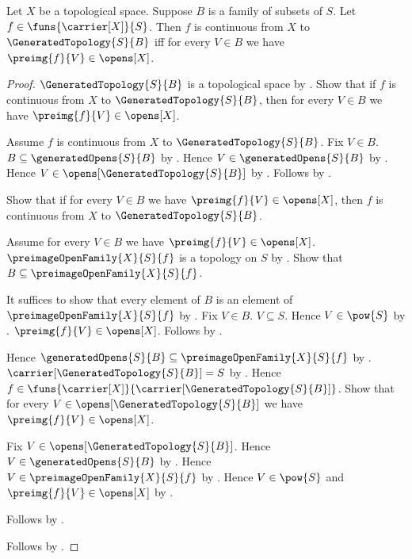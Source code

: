 \begin{theorem}\label{continuous_to_generated_topology_iff}
    Let $X$ be a topological space.
    Suppose $B$ is a family of subsets of $S$.
    Let $f\in\funs{\carrier[X]}{S}$.
    Then $f$ is continuous from $X$ to $\GeneratedTopology{S}{B}$ iff
        for every $V\in B$ we have $\preimg{f}{V}\in\opens[X]$.
\end{theorem}
\begin{proof}
    $\GeneratedTopology{S}{B}$ is a topological space by
        .
    Show that if $f$ is continuous from $X$ to
        $\GeneratedTopology{S}{B}$, then for every $V\in B$ we have
        $\preimg{f}{V}\in\opens[X]$.
    \begin{subproof}
        Assume $f$ is continuous from $X$ to $\GeneratedTopology{S}{B}$.
        Fix $V\in B$.
        $B\subseteq\generatedOpens{S}{B}$ by
            .
        Hence $V\in\generatedOpens{S}{B}$ by .
        Hence $V\in\opens[\GeneratedTopology{S}{B}]$ by
            .
        Follows by .
    \end{subproof}

    Show that if for every $V\in B$ we have
        $\preimg{f}{V}\in\opens[X]$, then
        $f$ is continuous from $X$ to $\GeneratedTopology{S}{B}$.
    \begin{subproof}
        Assume for every $V\in B$ we have
            $\preimg{f}{V}\in\opens[X]$.
        $\preimageOpenFamily{X}{S}{f}$ is a topology on $S$ by
            .
        Show that $B\subseteq\preimageOpenFamily{X}{S}{f}$.
        \begin{subproof}
            It suffices to show that every element of $B$ is an element of
                $\preimageOpenFamily{X}{S}{f}$ by .
            Fix $V\in B$.
            $V\subseteq S$.
            Hence $V\in\pow{S}$ by .
            $\preimg{f}{V}\in\opens[X]$.
            Follows by .
        \end{subproof}
        Hence $\generatedOpens{S}{B}
            \subseteq\preimageOpenFamily{X}{S}{f}$ by
            .
        $\carrier[\GeneratedTopology{S}{B}]=S$ by
            .
        Hence $f\in\funs{\carrier[X]}
            {\carrier[\GeneratedTopology{S}{B}]}$.
        Show that for every $V\in\opens[\GeneratedTopology{S}{B}]$ we have
            $\preimg{f}{V}\in\opens[X]$.
        \begin{subproof}
            Fix $V\in\opens[\GeneratedTopology{S}{B}]$.
            Hence $V\in\generatedOpens{S}{B}$ by
                .
            Hence $V\in\preimageOpenFamily{X}{S}{f}$ by .
            Hence $V\in\pow{S}$ and
                $\preimg{f}{V}\in\opens[X]$ by
                .
        \end{subproof}
        Follows by .
    \end{subproof}
    Follows by \auto.
\end{proof}
